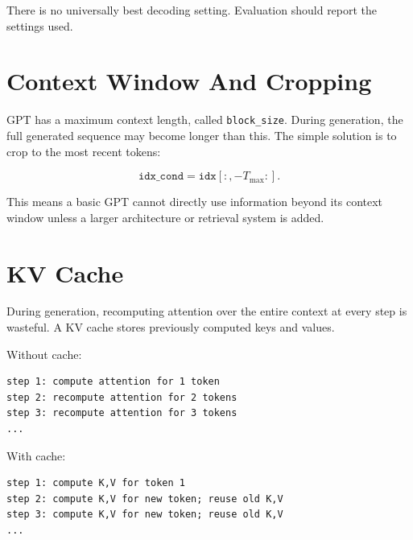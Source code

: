 There is no universally best decoding setting. Evaluation should report the settings used.

\section{Context Window And Cropping}

GPT has a maximum context length, called \texttt{block\_size}. During generation, the full generated sequence may become longer than this. The simple solution is to crop to the most recent tokens:

\[
\texttt{idx\_cond} = \texttt{idx}[:, -T_{\max}:].
\]

\begin{center}
\end{center}

This means a basic GPT cannot directly use information beyond its context window unless a larger architecture or retrieval system is added.

\section{KV Cache}

During generation, recomputing attention over the entire context at every step is wasteful. A KV cache stores previously computed keys and values.

Without cache:

\begin{lstlisting}
step 1: compute attention for 1 token
step 2: recompute attention for 2 tokens
step 3: recompute attention for 3 tokens
...
\end{lstlisting}

With cache:

\begin{lstlisting}
step 1: compute K,V for token 1
step 2: compute K,V for new token; reuse old K,V
step 3: compute K,V for new token; reuse old K,V
...
\end{lstlisting}

